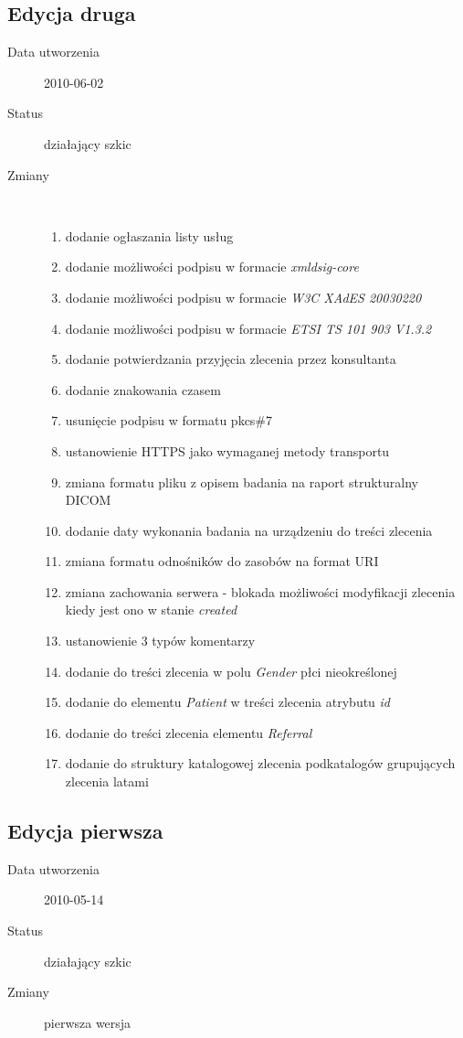 \documentclass[a4paper]{article}
\begin{document}
\subsection{Edycja druga}
\begin{description}
  \item[Data utworzenia] 2010-06-02
  \item[Status] działający szkic
  \item[Zmiany] \hfill \\
	\begin{enumerate}
      \item dodanie ogłaszania listy usług
	  \item dodanie możliwości podpisu w formacie \emph{xmldsig-core}
	  \item dodanie możliwości podpisu w formacie \emph{W3C XAdES 20030220}
	  \item dodanie możliwości podpisu w formacie \emph{ETSI TS 101 903 V1.3.2}
	  \item dodanie potwierdzania przyjęcia zlecenia przez konsultanta
	  \item dodanie znakowania czasem 
      \item usunięcie podpisu w formatu pkcs\#7
      \item ustanowienie HTTPS jako wymaganej metody transportu
      \item zmiana formatu pliku z opisem badania na raport strukturalny DICOM
      \item dodanie daty wykonania badania na urządzeniu do treści zlecenia
      \item zmiana formatu odnośników do zasobów na format URI
      \item zmiana zachowania serwera - blokada możliwości modyfikacji zlecenia kiedy
      jest ono w stanie \emph{created}
      \item ustanowienie 3 typów komentarzy
      \item dodanie do treści zlecenia w polu \emph{Gender} płci nieokreślonej
      \item dodanie do elementu \emph{Patient} w treści zlecenia atrybutu \emph{id}
      \item dodanie do treści zlecenia elementu \emph{Referral}
      \item dodanie do struktury katalogowej zlecenia podkatalogów grupujących zlecenia
      latami
	\end{enumerate}
\end{description}

\subsection{Edycja pierwsza}
\begin{description}
  \item[Data utworzenia] 2010-05-14
  \item[Status] działający szkic
  \item[Zmiany] pierwsza wersja
\end{description}
\end{document}
